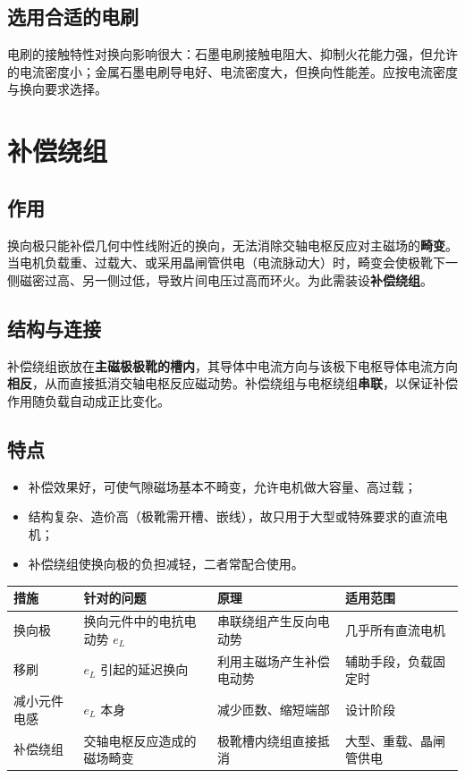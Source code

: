 \subsection{选用合适的电刷}
电刷的接触特性对换向影响很大：石墨电刷接触电阻大、抑制火花能力强，但允许的电流密度小；金属石墨电刷导电好、电流密度大，但换向性能差。应按电流密度与换向要求选择。

\section{补偿绕组}

\subsection{作用}
换向极只能补偿几何中性线附近的换向，无法消除交轴电枢反应对主磁场的\textbf{畸变}。当电机负载重、过载大、或采用晶闸管供电（电流脉动大）时，畸变会使极靴下一侧磁密过高、另一侧过低，导致片间电压过高而环火。为此需装设\textbf{补偿绕组}。

\subsection{结构与连接}
补偿绕组嵌放在\textbf{主磁极极靴的槽内}，其导体中电流方向与该极下电枢导体电流方向\textbf{相反}，从而直接抵消交轴电枢反应磁动势。补偿绕组与电枢绕组\textbf{串联}，以保证补偿作用随负载自动成正比变化。

\subsection{特点}
\begin{itemize}
  \item 补偿效果好，可使气隙磁场基本不畸变，允许电机做大容量、高过载；
  \item 结构复杂、造价高（极靴需开槽、嵌线），故只用于大型或特殊要求的直流电机；
  \item 补偿绕组使换向极的负担减轻，二者常配合使用。
\end{itemize}

\begin{center}
\begin{tabular}{@{}p{2.2cm}p{3.8cm}p{4.2cm}p{3.4cm}@{}}
\toprule
措施 & 针对的问题 & 原理 & 适用范围 \\
\midrule
换向极 & 换向元件中的电抗电动势 $e_L$ & 串联绕组产生反向电动势 & 几乎所有直流电机 \\
移刷 & $e_L$ 引起的延迟换向 & 利用主磁场产生补偿电动势 & 辅助手段，负载固定时 \\
减小元件电感 & $e_L$ 本身 & 减少匝数、缩短端部 & 设计阶段 \\
补偿绕组 & 交轴电枢反应造成的磁场畸变 & 极靴槽内绕组直接抵消 & 大型、重载、晶闸管供电 \\
\bottomrule
\end{tabular}
\end{center}

